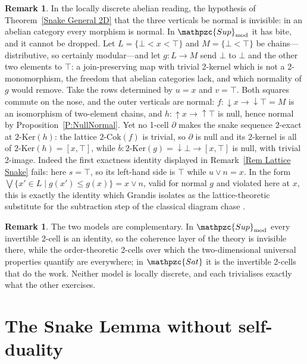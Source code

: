 \documentclass[reqno,a4paper]{amsart}
\numberwithin{equation}{section}
\theoremstyle{plain}
\theoremstyle{definition}
\newtheorem{remark}[subsection]{Remark}
\def\nameit#1{\textrm{#1}~}
\def\thex{\nameit{Theorem}}
\def\prox{\nameit{Proposition}}
\def\remx{\nameit{Remark}}
\newcommand{\ov}[1]{\overline{#1}}
\newcommand{\catfont}[1]{\ensuremath{\mathpzc{#1}}\xspace}
\newcommand{\Sat}{\catfont{Sat}}
\newcommand{\Supmod}{\ensuremath{\mathpzc{Sup}_{\mathrm{mod}}}}
\renewcommand{\1}{\onecat{1}}
\newcommand{\dseg}[1]{\ensuremath{{\downarrow}#1}}
\newcommand{\useg}[1]{\ensuremath{{\uparrow}#1}}
\newcommand{\TwoKer}{\ensuremath{2\text{-}\mathrm{Ker}}}
\newcommand{\TwoCoker}{\ensuremath{2\text{-}\mathrm{Cok}}}
\begin{document}
\begin{remark}\label{Rem Lattice Sharp}
	In the locally discrete abelian reading, the hypothesis of \thex\ref{Snake General 2D} that the three verticals be normal is invisible: in an abelian category every morphism is normal. In \(\Supmod\) it has bite, and it cannot be dropped. Let \(L=\{\bot<x<\top\}\) and \(M=\{\bot<\top\}\) be chains---distributive, so certainly modular---and let \(g\colon L\to M\) send \(\bot\) to \(\bot\) and the other two elements to \(\top\): a join-preserving map with trivial 2-kernel which is not a 2-monomorphism, the freedom that abelian categories lack, and which normality of \(g\) would remove. Take the rows determined by \(u=x\) and \(v=\top\). Both squares commute on the nose, and the outer verticals are normal: \(f\colon\dseg{x}\to\dseg{\top}=M\) is an isomorphism of two-element chains, and \(h\colon\useg{x}\to\useg{\top}\) is null, hence normal by \prox\ref{P:NullNormal}. Yet no 1-cell \(\partial\) makes the snake sequence 2-exact at \(\TwoKer(h)\): the lattice \(\TwoCoker(f)\) is trivial, so \(\partial\) is null and its 2-kernel is all of \(\TwoKer(h)=[x,\top]\), while \(\ov{b}\colon\TwoKer(g)=\dseg{\bot}\to[x,\top]\) is null, with trivial 2-image. Indeed the first exactness identity displayed in \remx\ref{Rem Lattice Snake} fails: here \(s=\top\), so its left-hand side is \(\top\) while \(u\vee n=x\). In the form \(\bigvee\{x'\in L\mid g(x')\leq g(x)\}=x\vee n\), valid for normal \(g\) and violated here at \(x\), this is exactly the identity which Grandis isolates as the lattice-theoretic substitute for the subtraction step of the classical diagram chase \cite[2.3.5]{Grandis-HA2}.
\end{remark}

\begin{remark}\label{Rem Lattice Scope}
	The two models are complementary. In \(\Supmod\) every invertible 2-cell is an identity, so the coherence layer of the theory is invisible there, while the order-theoretic 2-cells over which the two-dimensional universal properties quantify are everywhere; in \(\Sat\) it is the invertible 2-cells that do the work. Neither model is locally discrete, and each trivialises exactly what the other exercises.
\end{remark}

\section{The Snake Lemma without self-duality}\label{S:NonSelfDual}
\end{document}
